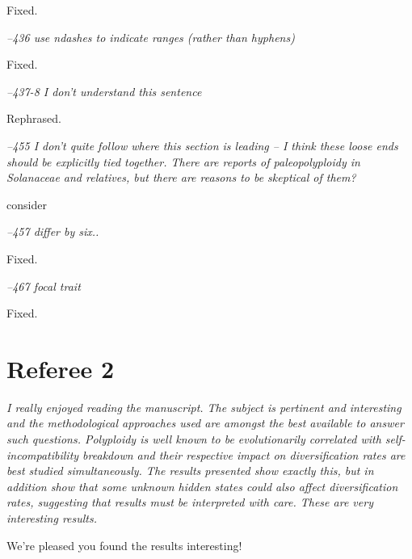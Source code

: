 \documentclass[11pt]{article}
\renewenvironment{quote}{\bigskip\noindent\itshape\ignorespaces}{\smallskip}
\begin{document}
Fixed. %

\begin{quote}
--436  use ndashes to indicate ranges (rather than hyphens)
\end{quote}

Fixed. %

\begin{quote}
--437-8 I don't understand this sentence
\end{quote}

Rephrased. %

\begin{quote}
--455  I don't quite follow where this section is leading -- I think these loose ends should be explicitly tied together.
There are reports of paleopolyploidy in Solanaceae and relatives, but there are reasons to be skeptical of them?
\end{quote}

consider %

\begin{quote}
--457  differ by six..
\end{quote}

Fixed. %

\begin{quote}
--467  focal trait
\end{quote}

Fixed. %

\section{Referee 2}
\vspace{-11pt}

\begin{quote}
I really enjoyed reading the manuscript.
The subject is pertinent and interesting and the methodological approaches used are amongst the best available to answer such questions.
Polyploidy is well known to be evolutionarily correlated with self-incompatibility breakdown and their respective impact on diversification rates are best studied simultaneously.
The results presented show exactly this, but in addition show that some unknown hidden states could also affect diversification rates, suggesting that results must be interpreted with care.
These are very interesting results.
\end{quote}

We're pleased you found the results interesting!
\end{document}
